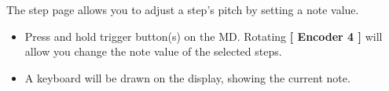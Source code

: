 \vspace{-0.3cm}


The step page allows you to adjust a step's pitch by setting a note value. 
\begin{itemize}
\item Press and hold trigger button(s) on the MD. Rotating \textbf{[ Encoder 4 ]} will allow you change the note value of the selected steps.
\item A keyboard will be drawn on the display, showing the current note.
\end{itemize}
